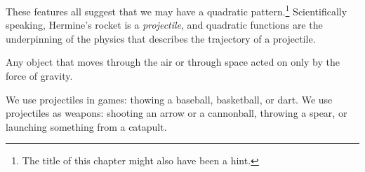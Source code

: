 These features all suggest that we may have a quadratic pattern.\footnote{The title of this chapter might also have been a hint.} Scientifically speaking, Hermine's rocket is a \textit{projectile}, and quadratic functions are the underpinning of the physics that describes the trajectory of a projectile.

%
%
%
%

\begin{boxdef}[Projectile]
Any object that moves through the air or through space acted on only by the force of gravity.
\end{boxdef}

We use projectiles in games: thowing a baseball, basketball, or dart. We use projectiles as weapons: shooting an arrow or a cannonball, throwing a spear, or launching something from a catapult.

